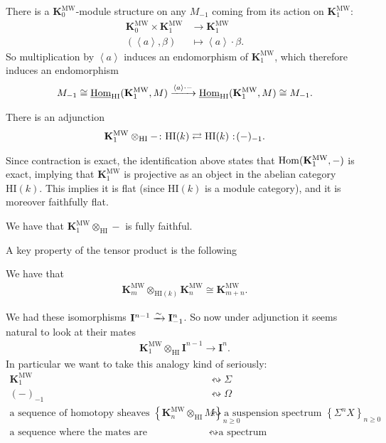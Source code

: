 \documentclass[11pt,openany]{book}
\providecommand{\HI}{\mathrm{HI}}
\providecommand{\KMW}{\mathbf{K}^\mathrm{MW}}
\begin{document}
There is a $\KMW_0$-module structure on any $M_{-1}$ coming from its action on $\KMW_1$:
\begin{align*}
    \KMW_0 \times \KMW_1 &\to \KMW_1 \\
    (\left\langle a \right\rangle, \beta) &\mapsto \left\langle a \right\rangle\cdot \beta.
\end{align*}
So multiplication by $\left\langle a \right\rangle$ induces an endomorphism of $\KMW_1$, which therefore induces an endomorphism
\begin{align*}
    M_{-1} \cong \underline{\Hom}_\HI (\KMW_1,M) \xto{\left\langle a \right\rangle\cdot -} \underline{\Hom}_\HI(\KMW_1,M) \cong M_{-1}.
\end{align*}
%



\begin{corollary} There is an adjunction
\begin{align*}
    \KMW_1 \otimes_\HI - \colon \HI(k) \rightleftarrows \HI(k) \noloc (-)_{-1}.
\end{align*}
\end{corollary}

Since contraction is exact, the identification above states that $\Hom(\KMW_1,-)$ is exact, implying that $\KMW_1$ is projective as an object in the abelian category $\HI(k)$. This implies it is flat (since $\HI(k)$ is a module category), and it is moreover faithfully flat.

\begin{proposition}\label{prop:K1MW-ff} \cite[1.15]{Deglise-MH}
We have that $\KMW_1 \otimes_\HI -$ is fully faithful.
\end{proposition}


A key property of the tensor product is the following

\begin{proposition} We have that
\begin{align*}
    \KMW_m \otimes_{\HI(k)} \KMW_n \cong \KMW_{m+n}.
\end{align*}
\end{proposition}



We had these isomorphisms $\mathbf{I}^{n-1} \xrightarrow{\sim} \mathbf{I}^n_{-1}$. So now under adjunction it seems natural to look at their mates
\begin{align*}
    \KMW_1 \otimes_{\HI} \mathbf{I}^{n-1} \to \mathbf{I}^n.
\end{align*}
%
In particular we want to take this analogy kind of seriously:
\begin{align*}
    \KMW_1 &\leftrightsquigarrow \Sigma \\
    (-)_{-1} &\leftrightsquigarrow \Omega \\
    \text{a sequence of homotopy sheaves } \left\{ \KMW_n \otimes_\HI M \right\}_{n\ge 0} & \leftrightsquigarrow \text{a suspension spectrum } \left\{ \Sigma^n X \right\}_{n\ge 0} \\
    \text{a sequence where the mates are equivalences} & \leftrightsquigarrow \text{a spectrum}
\end{align*}
\end{document}
